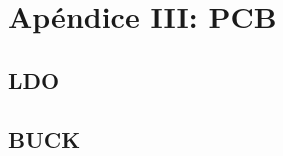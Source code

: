 \documentclass[]{article}
\begin{document}
\section{Apéndice III: PCB}
\subsection{LDO}
\label{sec:apendice_PCB}





\subsection{BUCK}
	



	
	
\end{document}
